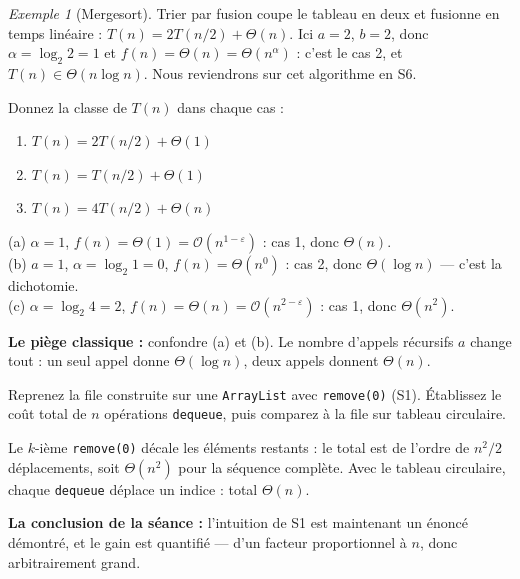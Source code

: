 \documentclass[11pt,a4paper]{article}
\newcommand{\bigO}{\mathcal{O}}
\newcommand{\bigTheta}{\Theta}
\theoremstyle{definition}
\theoremstyle{remark}
\newtheorem{example}{Exemple}[section]
\begin{document}
\begin{example}[Mergesort]
Trier par fusion coupe le tableau en deux et fusionne en temps linéaire :
$T(n) = 2T(n/2) + \bigTheta(n)$. Ici $a = 2$, $b = 2$, donc
$\alpha = \log_2 2 = 1$ et $f(n) = \bigTheta(n) = \bigTheta(n^{\alpha})$ :
c'est le cas 2, et $T(n) \in \bigTheta(n \log n)$. Nous reviendrons sur cet
algorithme en S6.
\end{example}

\begin{appliboxQ}
Donnez la classe de $T(n)$ dans chaque cas :
\begin{enumerate}[nosep,label=(\alph*)]
    \item $T(n) = 2T(n/2) + \bigTheta(1)$
    \item $T(n) = T(n/2) + \bigTheta(1)$
    \item $T(n) = 4T(n/2) + \bigTheta(n)$
\end{enumerate}
\end{appliboxQ}

\begin{appliboxR}[Réponse]
(a) $\alpha = 1$, $f(n) = \bigTheta(1) = \bigO(n^{1-\varepsilon})$ : cas 1,
donc $\bigTheta(n)$.\\
(b) $a = 1$, $\alpha = \log_2 1 = 0$, $f(n) = \bigTheta(n^0)$ : cas 2, donc
$\bigTheta(\log n)$ --- c'est la dichotomie.\\
(c) $\alpha = \log_2 4 = 2$, $f(n) = \bigTheta(n) = \bigO(n^{2-\varepsilon})$ :
cas 1, donc $\bigTheta(n^2)$.

\textbf{Le piège classique :} confondre (a) et (b). Le nombre d'appels
récursifs $a$ change tout : un seul appel donne $\bigTheta(\log n)$, deux
appels donnent $\bigTheta(n)$.
\end{appliboxR}

\begin{appliboxQ}
Reprenez la file construite sur une \texttt{ArrayList} avec
\texttt{remove(0)} (S1). Établissez le coût total de $n$ opérations
\texttt{dequeue}, puis comparez à la file sur tableau circulaire.
\end{appliboxQ}

\begin{appliboxR}[Réponse]
Le $k$-ième \texttt{remove(0)} décale les éléments restants : le total est de
l'ordre de $n^2/2$ déplacements, soit $\bigTheta(n^2)$ pour la séquence
complète. Avec le tableau circulaire, chaque \texttt{dequeue} déplace un
indice : total $\bigTheta(n)$.

\textbf{La conclusion de la séance :} l'intuition de S1 est maintenant un
énoncé démontré, et le gain est quantifié --- d'un facteur proportionnel à
$n$, donc arbitrairement grand.
\end{appliboxR}
\end{document}
